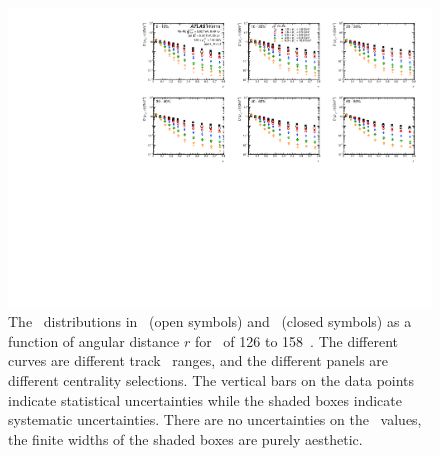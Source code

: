 \begin{figure}[h]
\centerline{
            \includegraphics[width=1\textwidth]{figures/results/yChPS_final_dR_CONF_DpT_data_jet7.pdf} 
      }
\caption{The \Dptr\ distributions in \pp\ (open symbols) and \pbpb\ (closed symbols) as a function of angular distance $r$ for \ptjet\ of 126 to 158~\GeV. The different curves are different track \pt\ ranges, and the different panels are different centrality selections. The vertical bars on the data points indicate statistical uncertainties while the shaded boxes indicate systematic uncertainties. There are no uncertainties on the \rvar\ values, the finite widths of the shaded boxes are purely aesthetic.}
\label{fig:dptr}
\end{figure}


